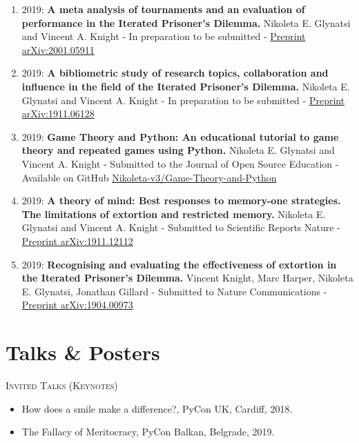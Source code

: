 \begin{enumerate}
	\def\labelenumi{\arabic{enumi}.}
\item 2019: \textbf{A meta analysis of tournaments and an evaluation of
performance in the Iterated Prisoner’s Dilemma.} Nikoleta E. Glynatsi and Vincent A. Knight -
In preparation to be submitted - \href{https://arxiv.org/abs/2001.05911}{Preprint arXiv:2001.05911}
\item 2019: \textbf{A bibliometric study of research topics, collaboration and influence in the field of the Iterated Prisoner's Dilemma.}
Nikoleta E. Glynatsi and Vincent A. Knight -
In preparation to be submitted - \href{https://arxiv.org/abs/1911.12112}{Preprint arXiv:1911.06128}
\item 2019: \textbf{Game Theory and Python: An educational tutorial to game
theory and repeated games using Python.} Nikoleta E. Glynatsi and Vincent A. Knight -
Submitted to the Journal of Open Source Education - Available on GitHub
\href{https://github.com/Nikoleta-v3/Game-Theory-and-Python}{Nikoleta-v3/Game-Theory-and-Python}
\item 2019: \textbf{A theory of mind: Best responses to memory-one strategies.
The limitations of extortion and restricted memory.} Nikoleta E. Glynatsi and Vincent A. Knight -
Submitted to Scientific Reports Nature -
\href{https://arxiv.org/abs/1911.12112}{Preprint arXiv:1911.12112}
\item 2019: \textbf{Recognising and evaluating the effectiveness of extortion in
the Iterated Prisoner's Dilemma.} Vincent Knight, Marc Harper, Nikoleta E. Glynatsi,
Jonathan Gillard -
Submitted to Nature Communications -
\href{https://arxiv.org/abs/1904.00973}{Preprint arXiv:1904.00973}
\end{enumerate}

\section*{Talks \& Posters}

\textsc{Invited Talks (Keynotes)}
\begin{itemize}
	\item How does a smile make a difference?, PyCon UK, Cardiff, 2018.
	\item The Fallacy of Meritocracy, PyCon Balkan, Belgrade, 2019.
\end{itemize}

